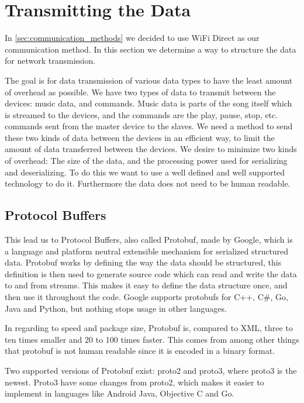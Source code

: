 \section{Transmitting the Data}
In \cref{sec:communication_methods} we decided to use WiFi Direct as our communication method.
In this section we determine a way to structure the data for network transmission.

\bigskip
The goal is for data transmission of various data types to have the least amount of overhead as possible.
We have two types of data to transmit between the devices: music data, and commands.
Music data is parts of the song itself which is streamed to the devices,
and the commands are the play, pause, stop, etc. commands sent from the master device to the slaves.
We need a method to send these two kinds of data between the devices in an efficient way,
to limit the amount of data transferred between the devices.
We desire to minimize two kinds of overhead: The size of the data, and the processing power used for serializing and deserializing.
To do this we want to use a well defined and well supported technology to do it.
Furthermore the data does not need to be human readable.

\subsection{Protocol Buffers}
This lead us to Protocol Buffers, also called Protobuf, made by Google, which is a language and platform neutral extensible mechanism for serialized structured data. 
Protobuf works by defining the way the data should be structured, this definition is then used to generate source code which can read and write the data to and from streams.\cite{protobuf}
This makes it easy to define the data structure once, and then use it throughout the code.
Google supports protobufs for C++, C\#, Go, Java and Python, but nothing stops usage in other languages\cite{protobuf}.

In regarding to speed and package size, Protobuf is, compared to XML, three to ten times smaller and 20 to 100 times faster.
This comes from among other things that protobuf is not human readable since it is encoded in a binary format.\cite{protobuf} 

Two supported versions of Protobuf exist: proto2 and proto3, where proto3 is the newest.
Proto3 have some changes from proto2, which makes it easier to implement in languages like Android Java, Objective C and Go.\cite{proto3}

